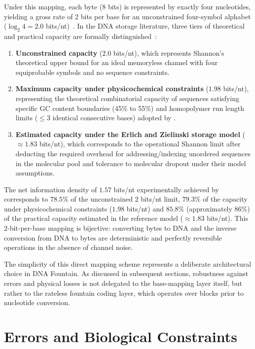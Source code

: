 Under this mapping, each byte (8 bits) is represented by exactly four nucleotides, yielding a gross rate of 2 bits per base for an unconstrained four-symbol alphabet ($\log_2 4 = 2.0$ bits/nt)~\cite{shannon1948}. In the DNA storage literature, three tiers of theoretical and practical capacity are formally distinguished~\cite{erlich2017}:
\begin{enumerate}
    \item \textbf{Unconstrained capacity} ($2.0$ bits/nt), which represents Shannon's theoretical upper bound for an ideal memoryless channel with four equiprobable symbols and no sequence constraints.
    \item \textbf{Maximum capacity under physicochemical constraints} ($1.98$ bits/nt), representing the theoretical combinatorial capacity of sequences satisfying specific GC content boundaries (45\% to 55\%) and homopolymer run length limits ($\le 3$ identical consecutive bases) adopted by .
    \item \textbf{Estimated capacity under the Erlich and Zielinski storage model} ($\approx 1.83$ bits/nt), which corresponds to the operational Shannon limit after deducting the required overhead for addressing/indexing unordered sequences in the molecular pool and tolerance to molecular dropout under their model assumptions.
\end{enumerate}
The net information density of $1.57$ bits/nt experimentally achieved by  corresponds to $78.5\%$ of the unconstrained 2 bits/nt limit, $79.3\%$ of the capacity under physicochemical constraints ($1.98$ bits/nt) and $85.8\%$ (approximately $86\%$) of the practical capacity estimated in the reference model ($\approx 1.83$ bits/nt). This 2-bit-per-base mapping is bijective: converting bytes to DNA and the inverse conversion from DNA to bytes are deterministic and perfectly reversible operations in the absence of channel noise.

The simplicity of this direct mapping scheme represents a deliberate architectural choice in DNA Fountain. As discussed in subsequent sections, robustness against errors and physical losses is not delegated to the base-mapping layer itself, but rather to the rateless fountain coding layer, which operates over blocks prior to nucleotide conversion.

\section{Errors and Biological Constraints}
\label{sec:errors_and_biological_constraints}

